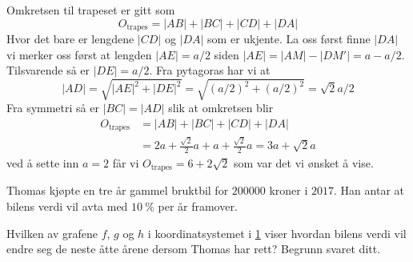 \begin{losninger}
  Omkretsen til trapeset er gitt som
  \begin{equation}
    O_{\text{trapes}} = |AB| + |BC| + |CD| + |DA|
  \end{equation}
  Hvor det bare er lengdene $|CD|$ og $|DA|$ som er ukjente. La oss først
  finne $|DA|$ vi merker oss først at lengden $|AE| = a/2$ siden $|AE| = |AM|
  - |DM'| = a - a/2$.  Tilsvarende så er $|DE| = a/2$. Fra pytagoras har vi at
  \begin{equation}
    |AD|
    = \sqrt{|AE|^2 + |DE|^2}
    = \sqrt{(a/2)^2 + (a/2)^2}
    = \sqrt{2}a/2
  \end{equation}
  Fra symmetri så er $|BC|=|AD|$ slik at omkretsen blir
  \begin{align*}
    O_{\text{trapes}}
        & = |AB| + |BC| + |CD| + |DA| \\
        & =   2a  +   \frac{\sqrt{2}}{2}a + a + \frac{\sqrt{2}}{2}a
        =   3a  + \sqrt{2}a
  \end{align*}
  ved å sette inn $a=2$ får vi $O_{\text{trapes}} = 6 + 2 \sqrt{2}$ som var
  det vi ønsket å vise.
\end{losninger}


\Oppgave[2] %

Thomas kjøpte en tre år gammel bruktbil for $\num{200000}$ kroner i $2017$. Han
antar at bilens verdi vil avta med  $\SI{10}{\percent}$ per år framover.

\begin{oppgaver}
   Hvilken av grafene $f$, $g$ og $h$ i koordinatsystemet i
    \cref{fig:del-1-oppgave-6} viser hvordan bilens verdi vil endre seg de neste
    åtte årene dersom Thomas har rett? Begrunn svaret ditt.
\end{oppgaver}

\begin{figure}[H]
  \caption{}
  \label{fig:del-1-oppgave-6}
\end{figure}

